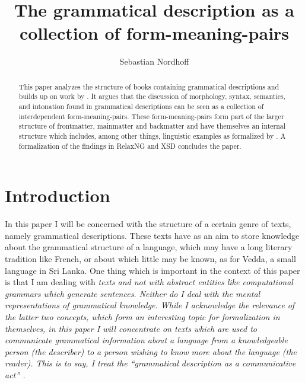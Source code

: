 \documentclass[a4paper,12pt]{article}
\title{The grammatical description as a collection of form-meaning-pairs}
\author{Sebastian Nordhoff}
\begin{document}
\maketitle
\begin{abstract}
This paper analyzes the structure of books containing grammatical descriptions and builds up on work by \citet{Good2004}. It argues that the discussion of morphology, syntax, semantics, and intonation found in grammatical descriptions can be seen as a collection of interdependent form-meaning-pairs. These form-meaning-pairs form part of the larger structure of frontmatter, mainmatter and backmatter \citep{Mosel2006craft} and have themselves an internal structure which includes, among other things, linguistic examples as formalized by \citet{BowEtAl2003}. A formalization of the findings in RelaxNG and XSD concludes the paper.
\end{abstract} 

\section{Introduction}
In this paper I will be concerned with the structure of a certain genre of texts, namely grammatical descriptions. These texts have as an aim to store knowledge about the grammatical structure of a language, which may have a long literary tradition like French, or about which little may be known, as for Vedda, a small language in Sri Lanka. One thing which is important in the context of this paper is that I am dealing with \em texts \em and not with abstract entities like computational grammars which generate sentences. Neither do I deal with the mental representations of grammatical knowledge. While I acknowledge the relevance of the latter two concepts, which form an interesting topic for formalization in themselves, in this paper I will concentrate on texts which are used to communicate grammatical information about a language from a knowledgeable person (the describer) to a person wishing to know more about the language (the reader). This is to say, I treat the  ``grammatical description as a communicative act'' \citep{Payne2006}.



\end{document}
